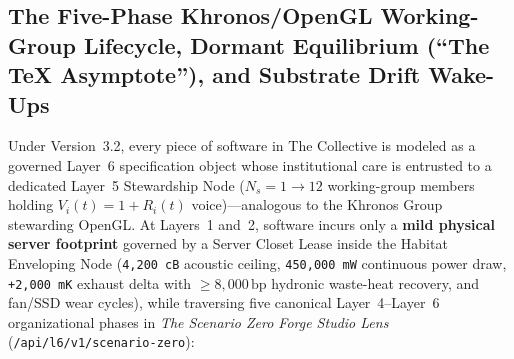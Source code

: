 \subsection{The Five-Phase Khronos/OpenGL Working-Group Lifecycle, Dormant Equilibrium (``The \TeX{} Asymptote''), and Substrate Drift Wake-Ups}
\label{subsec:wave-a-khronos-tex-asymptote}

Under Version~3.2, every piece of software in The Collective is modeled as a governed Layer~6 specification object whose institutional care is entrusted to a dedicated Layer~5 Stewardship Node ($N_s = 1 \to 12$ working-group members holding $V_i(t) = 1 + R_i(t)$ voice)---analogous to the Khronos Group stewarding OpenGL. At Layers~1 and~2, software incurs only a \textbf{mild physical server footprint} governed by a Server Closet Lease inside the Habitat Enveloping Node (\texttt{4,200 cB} acoustic ceiling, \texttt{450,000 mW} continuous power draw, \texttt{+2,000 mK} exhaust delta with $\ge 8{,}000\,\mathrm{bp}$ hydronic waste-heat recovery, and fan/SSD wear cycles), while traversing five canonical Layer~4--Layer~6 organizational phases in \textit{The Scenario Zero Forge Studio Lens} (\texttt{/api/l6/v1/scenario-zero}):
